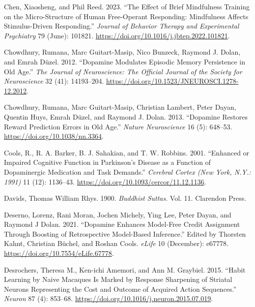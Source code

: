 \documentclass{article}
\newlength{\cslhangindent}
\newlength{\cslentryspacingunit} %
\newenvironment{CSLReferences}[2] %
 {%
  \setlength{\parindent}{0pt}
  \ifodd #1
  \let\oldpar\par
  \def\par{\hangindent=\cslhangindent\oldpar}
  \fi
  \setlength{\parskip}{#2\cslentryspacingunit}
 }%
 {}
\begin{document}
\begin{CSLReferences}{1}{0}
\leavevmode{}%
Chen, Xiaosheng, and Phil Reed. 2023. {``The Effect of Brief Mindfulness
Training on the Micro-Structure of Human Free-Operant Responding:
{Mindfulness} Affects Stimulus-Driven Responding.''} \emph{Journal of
Behavior Therapy and Experimental Psychiatry} 79 (June): 101821.
\url{https://doi.org/10.1016/j.jbtep.2022.101821}.

\leavevmode{}%
Chowdhury, Rumana, Marc Guitart-Masip, Nico Bunzeck, Raymond J. Dolan,
and Emrah Düzel. 2012. {``Dopamine Modulates Episodic Memory Persistence
in Old Age.''} \emph{The Journal of Neuroscience: The Official Journal
of the Society for Neuroscience} 32 (41): 14193--204.
\url{https://doi.org/10.1523/JNEUROSCI.1278-12.2012}.

\leavevmode{}%
Chowdhury, Rumana, Marc Guitart-Masip, Christian Lambert, Peter Dayan,
Quentin Huys, Emrah Düzel, and Raymond J. Dolan. 2013. {``Dopamine
Restores Reward Prediction Errors in Old Age.''} \emph{Nature
Neuroscience} 16 (5): 648--53. \url{https://doi.org/10.1038/nn.3364}.

\leavevmode{}%
Cools, R., R. A. Barker, B. J. Sahakian, and T. W. Robbins. 2001.
{``Enhanced or Impaired Cognitive Function in {Parkinson}'s Disease as a
Function of Dopaminergic Medication and Task Demands.''} \emph{Cerebral
Cortex (New York, N.Y.: 1991)} 11 (12): 1136--43.
\url{https://doi.org/10.1093/cercor/11.12.1136}.

\leavevmode{}%
Davids, Thomas William Rhys. 1900. \emph{Buddhist Suttas}. Vol. 11.
{Clarendon Press}.

\leavevmode{}%
Deserno, Lorenz, Rani Moran, Jochen Michely, Ying Lee, Peter Dayan, and
Raymond J Dolan. 2021. {``Dopamine Enhances Model-Free Credit Assignment
Through Boosting of Retrospective Model-Based Inference.''} Edited by
Thorsten Kahnt, Christian Büchel, and Roshan Cools. \emph{eLife} 10
(December): e67778. \url{https://doi.org/10.7554/eLife.67778}.

\leavevmode{}%
Desrochers, Theresa M., Ken-ichi Amemori, and Ann M. Graybiel. 2015.
{``Habit {Learning} by {Naive Macaques Is Marked} by {Response
Sharpening} of {Striatal Neurons Representing} the {Cost} and {Outcome}
of {Acquired Action Sequences}.''} \emph{Neuron} 87 (4): 853--68.
\url{https://doi.org/10.1016/j.neuron.2015.07.019}.


\end{CSLReferences}
\end{document}
